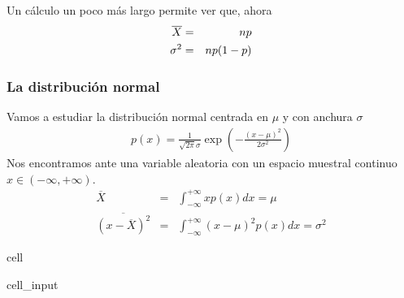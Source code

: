\documentclass[letterpaper,10pt,english]{jupyterBook}
\begin{document}
\sphinxAtStartPar
Un cálculo un poco más largo permite ver que, ahora
\label{equation:docs/Part_01_Formalismo/Chapter_01_02_Formalismo_matemático/01_05_Probabilidades_myst:2baffff7-0932-44a0-9b82-35228246f46a}\begin{eqnarray}
\overline X &=&  np\\ \rule{0mm}{7mm}
\sigma^2 &=& n p(1-p)
\end{eqnarray}

\subsubsection{La distribución normal}
\label{\detokenize{docs/Part_01_Formalismo/Chapter_01_02_Formalismo_matem_xe1tico/01_05_Probabilidades_myst:la-distribucion-normal}}
\sphinxAtStartPar
Vamos a estudiar la distribución normal centrada en \(\mu\) y con anchura \(\sigma\)
\begin{equation*}
\begin{split}
p(x) = \frac{1}{\sqrt{2\pi}\sigma} \exp \left({-\frac{(x-\mu)^2}{2\sigma^2}}\right)
\end{split}
\end{equation*}
\sphinxAtStartPar
Nos encontramos ante una variable aleatoria con un espacio muestral continuo \(x\in (-\infty,+\infty)\).
\label{equation:docs/Part_01_Formalismo/Chapter_01_02_Formalismo_matemático/01_05_Probabilidades_myst:17309e7c-ec4d-44cd-93d4-2906cafa554d}\begin{eqnarray}
\overline{X} &=& \int_{-\infty}^{+\infty} xp(x) dx = \mu \\
\overline{(x-\overline X)^2} &=& \int_{-\infty}^{+\infty} (x-\mu)^2 p(x)dx =\sigma^2
\end{eqnarray}
\begin{sphinxuseclass}{cell}\begin{sphinxVerbatimInput}

\begin{sphinxuseclass}{cell_input}
\begin{sphinxVerbatim}[commandchars=\\\{\}]
     
  
    
\end{sphinxVerbatim}

\end{sphinxuseclass}\end{sphinxVerbatimInput}

\end{sphinxuseclass}
\end{document}
